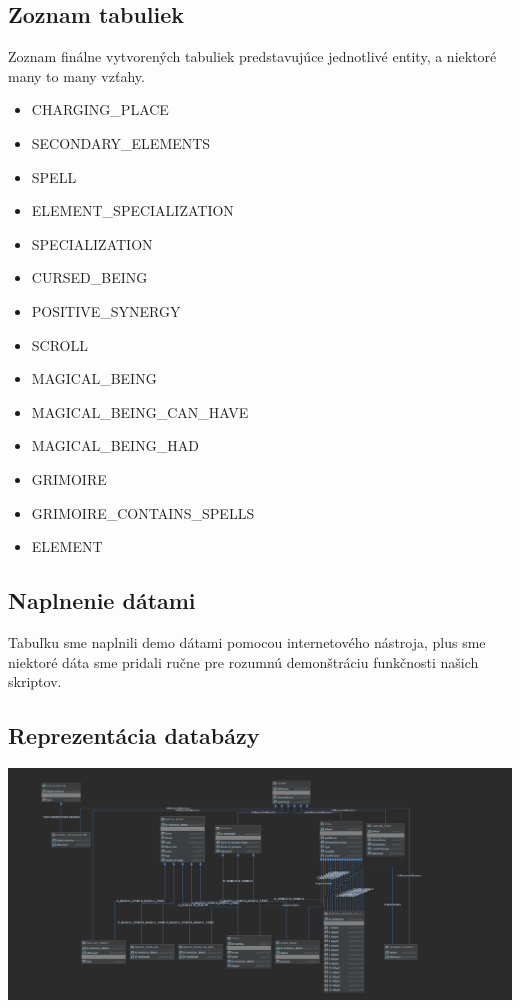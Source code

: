 \documentclass{article}
\begin{document}
    \subsection{Zoznam tabuliek}
    \Large{Zoznam finálne vytvorených tabuliek predstavujúce jednotlivé entity, a niektoré many to many vzťahy.}
    \begin{itemize}
	\item CHARGING\_PLACE
	\item SECONDARY\_ELEMENTS
	\item SPELL
	\item ELEMENT\_SPECIALIZATION
	\item SPECIALIZATION
	\item CURSED\_BEING
	\item POSITIVE\_SYNERGY
	\item SCROLL
	\item MAGICAL\_BEING
	\item MAGICAL\_BEING\_CAN\_HAVE
	\item MAGICAL\_BEING\_HAD
	\item GRIMOIRE
	\item GRIMOIRE\_CONTAINS\_SPELLS
	\item ELEMENT
    \end{itemize}
    \subsection{Naplnenie dátami}
    \Large{Tabuľku sme naplnili demo dátami pomocou internetového nástroja, plus sme niektoré dáta sme pridali ručne pre rozumnú demonštráciu funkčnosti našich skriptov.}\\[0.4cm]
    \subsection{Reprezentácia databázy}
    \center\includegraphics[width=1\linewidth]{./unknown.png}\\[5cm]
    \newpage
\end{document}
